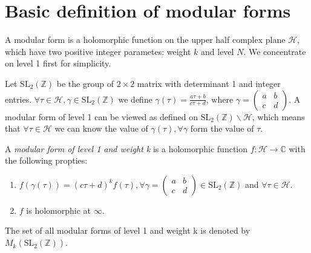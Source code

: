     
    \section{Basic definition of modular forms}

    A modular form is a holomorphic function on the upper half complex plane $\mathcal{H} $, which have two positive integer parametes: weight $k$ and level $N$. We concentrate on level 1 first for simplicity.
    
    Let \(\mathrm{SL}_2(\mathbb{Z})\) be the group of $ 2\times 2 $ matrix with determinant 1 and integer entries.  $\forall \tau \in \mathcal{H}, \gamma \in \mathrm{SL}_2(\mathbb{Z}) $ we define $\gamma(\tau) = \frac{a\tau+b}{c\tau+d} $, where 
    $\gamma = 
        \left(
            \begin{smallmatrix}
            a & b \\
            c & d
            \end{smallmatrix}
        \right)
    $.
    A modular form of level 1 can be viewed as defined on $ \mathrm{SL}_2(\mathbb{Z})\backslash \mathcal{H} $, which means that $\forall \tau\in \mathcal{H}$ we can know the value of $\gamma(\tau), \forall \gamma$ form the value of $\tau$.

    \begin{definition} \label{def1}
        A \textit{modular form of level 1 and weight k} is a holomorphic function $f: \mathcal{H} \to \mathbb{C}$ with the following propties:
        \begin{enumerate}
            \item $f(\gamma(\tau))=(c\tau +d)^kf(\tau), \forall \gamma = 
                \left(
                    \begin{smallmatrix}
                    a & b \\
                    c & d
                    \end{smallmatrix}
                \right)\in \mathrm{SL}_2(\mathbb{Z})$ and $\forall\tau \in \mathcal{H}$.
            \item $f$ is holomorphic at $\infty$.
        \end{enumerate}

        The set of all modular forms of level 1 and weight k is denoted by $M_k(\mathrm{SL}_2(\mathbb{Z}))$. 
    \end{definition}

